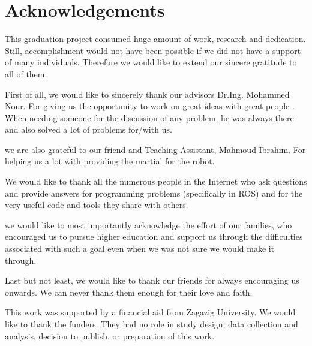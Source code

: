 
\chapter*{Acknowledgements}

This graduation project consumed huge amount of work, research and dedication. Still, accomplishment would not have been possible if we did not have a support of many individuals. Therefore we would like to extend our sincere gratitude to all of them.

First of all, we would like to sincerely thank our advisors Dr.Ing. Mohammed Nour. For giving us the opportunity to work on great ideas with great people . When needing someone for the
discussion of any problem, he was always there and also solved a lot of problems for/with us.


we are also grateful to our friend and Teaching Assistant, Mahmoud Ibrahim. For helping us a lot with providing the martial for the robot.


We would like to thank all the numerous people in the Internet who ask questions and provide answers for programming problems (specifically in ROS) and for the very useful code and tools they share with others.

we would like to most importantly acknowledge the effort of our families, who encouraged us to pursue higher education and support us through the difficulties associated with such a goal even when we was not sure we would make it through. 

Last but not least, we would like to thank our friends for always encouraging us onwards. We can
never thank them enough for their love and faith.

This work was supported by a financial aid  from Zagazig University. We would like to thank the funders. They had no role in study design, data collection and analysis, decision to publish, or preparation of this work.
